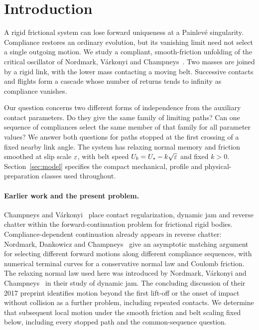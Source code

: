 \section{Introduction}
\label{sec:introduction}

A rigid frictional system can lose forward uniqueness at a Painlev\'e
singularity. Compliance restores an ordinary evolution, but its
vanishing limit need not select a single outgoing motion. We study
a compliant, smooth-friction unfolding of the critical oscillator
of Nordmark, V\'arkonyi and Champneys~\cite[Section~6.1]{NVC2018}.
Two masses are joined by a rigid link, with the lower mass contacting
a moving belt. Successive contacts and flights form a cascade whose
number of returns tends to infinity as compliance vanishes.

Our question concerns two different forms of independence from the
auxiliary contact parameters. Do they give the same family of limiting
paths? Can one sequence of compliances select the same member of that
family for all parameter values? We answer both questions for paths
stopped at the first crossing of a fixed nearby link angle. The system
has relaxing normal memory and friction smoothed at slip scale $\varepsilon$,
with belt speed $U_b=U_*-k\sqrt{\varepsilon}$ and fixed $k>0$.
Section~\ref{sec:model} specifies the compact mechanical, profile and
physical-preparation classes used throughout.

\paragraph{Earlier work and the present problem.}
Champneys and V\'arkonyi~\cite[Sections~4, 5.1 and~5.3]{CV2016}
place contact regularization, dynamic jam and reverse chatter within
the forward-continuation problem for frictional rigid bodies.
Compliance-dependent continuation already appears in reverse
chatter: Nordmark, Dankowicz and
Champneys~\cite[Sections~5.2 and~6.1]{NDC2009} give an asymptotic
matching argument for selecting different forward motions along
different compliance sequences, with numerical terminal curves for
a conservative normal law and Coulomb friction. The relaxing
normal law used here was introduced by Nordmark, V\'arkonyi and
Champneys~\cite[Equations~(20)--(21)]{NVC2018} in their study of
dynamic jam. The concluding discussion of their 2017 preprint
identifies motion beyond the first lift-off or the onset of impact
without collision as a further problem, including repeated
contacts. We determine that subsequent local motion under the
smooth friction and belt scaling fixed below, including every
stopped path and the common-sequence question.

